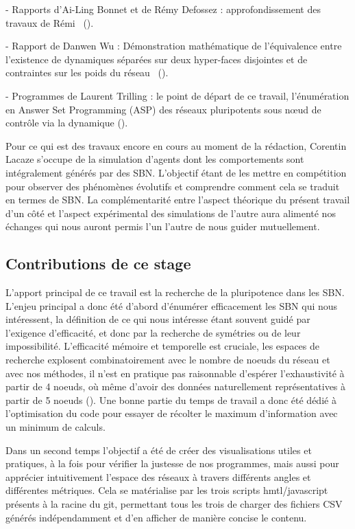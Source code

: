 \documentclass[12pt, a4paper]{article}
\begin{document}
- Rapports d'Ai-Ling Bonnet et de Rémy Defossez : approfondissement des travaux de Rémi~\cite{bonnet2023,defossez2021} ().

- Rapport de Danwen Wu : Démonstration mathématique de l'équivalence entre l'existence de dynamiques séparées sur deux hyper-faces disjointes et de contraintes sur les poids du réseau~\cite{wu2024} ().

- Programmes de Laurent Trilling : le point de départ de ce travail, l'énumération en Answer Set Programming (ASP) des réseaux pluripotents sous nœud de contrôle via la dynamique ().

Pour ce qui est des travaux encore en cours au moment de la rédaction, Corentin Lacaze s'occupe de la simulation d'agents dont les comportements sont intégralement générés par des SBN. L'objectif étant de les mettre en compétition pour observer des phénomènes évolutifs et comprendre comment cela se traduit en termes de SBN. La complémentarité entre l'aspect théorique du présent travail d'un côté et l'aspect expérimental des simulations de l'autre aura alimenté nos échanges qui nous auront permis l'un l'autre de nous guider mutuellement.


\subsection{Contributions de ce stage}

L'apport principal de ce travail est la recherche de la pluripotence dans les SBN. L'enjeu principal a donc été d'abord d'énumérer efficacement les SBN qui nous intéressent, la définition de ce qui nous intéresse étant souvent guidé par l'exigence d'efficacité, et donc par la recherche de symétries ou de leur impossibilité. L'efficacité mémoire et temporelle est cruciale, les espaces de recherche explosent combinatoirement avec le nombre de noeuds du réseau et avec nos méthodes, il n'est en pratique pas raisonnable d'espérer l'exhaustivité à partir de 4 noeuds, où même d'avoir des données naturellement représentatives à partir de 5 noeuds (). Une bonne partie du temps de travail a donc été dédié à l'optimisation du code pour essayer de récolter le maximum d'information avec un minimum de calculs.  

Dans un second temps l'objectif a été de créer des visualisations utiles et pratiques, à la fois pour vérifier la justesse de nos programmes, mais aussi pour apprécier intuitivement l'espace des réseaux à travers différents angles et différentes métriques. Cela se matérialise par les trois scripts hmtl/javascript présents à la racine du git, permettant tous les trois de charger des fichiers CSV générés indépendamment et d'en afficher de manière concise le contenu. 
\end{document}
